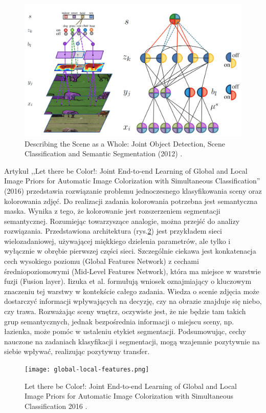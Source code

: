 \begin{figure}[ht!]
    \includegraphics[width=\textwidth]{img/joint-segmentation-and-classification.png}
    \caption{Describing the Scene as a Whole: Joint Object Detection, Scene Classification and Semantic Segmentation (2012) \cite{yao2012describing}.}
    \label{fig:scene-as-a-whole}
\end{figure}
\vspace{0.5cm}
Artykuł ,,Let there be Color!: Joint End-to-end Learning of Global and Local Image Priors for Automatic Image Colorization with Simultaneous Classification'' (2016) \cite{iizuka2016let} przedstawia rozwiązanie problemu jednoczesnego klasyfikowania sceny oraz kolorowania zdjęć. Do realizacji zadania kolorowania potrzebna jest semantyczna maska. Wynika z tego, że kolorowanie jest rozszerzeniem segmentacji semantycznej. Rozumiejąc towarzyszące analogie, można przejść do analizy rozwiązania. Przedstawiona architektura (rys.\ref{fig:parrarel-arch}) jest przykładem sieci wielozadaniowej, używającej miękkiego dzielenia parametrów, ale tylko i wyłącznie w obrębie pierwszej części sieci. Szczególnie ciekawa jest konkatenacja cech wysokiego poziomu (Global Features Network) z cechami średniopoziomowymi (Mid-Level Features Network), która ma miejsce w warstwie fuzji (Fusion layer). Iizuka et al. formułują wniosek oznajmiający o kluczowym znaczeniu tej warstwy w kontekście całego zadania. Wiedza o scenie zdjęcia może dostarczyć informacji wpływających na decyzję, czy na obrazie znajduje się niebo, czy trawa. Rozważając sceny wnętrz, oczywiste jest, że nie będzie tam takich grup semantycznych, jednak bezpośrednia informacji o miejscu sceny, np. łazienka, może pomóc w ustaleniu etykiet segmentacji. Podsumowując, cechy nauczone na zadaniach klasyfikacji i segmentacji, mogą wzajemnie pozytywnie na siebie wpływać, realizując pozytywny transfer.
\begin{figure}[ht!]
    \texttt{[image: global-local-features.png]}
    \caption{Let there be Color!: Joint End-to-end Learning of Global and Local Image Priors for Automatic Image Colorization with Simultaneous Classification 2016 \cite{iizuka2016let}.}
    \label{fig:parrarel-arch}
\end{figure}


